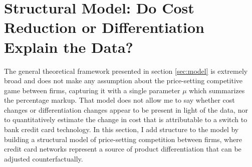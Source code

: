 \documentclass[12pt,english]{article}
\begin{document}

\section{Structural Model: Do Cost Reduction or Differentiation Explain the Data?}\label{sec:structural}

The general theoretical framework presented in section \ref{sec:model} is extremely broad and does not make any assumption about the price-setting competitive game between firms, capturing it with a single parameter $\mu$ which summarizes the percentage markup. That model does not allow me to say whether cost changes or differentiation changes appear to be present in light of the data, nor to quantitatively estimate the change in cost that is attributable to a switch to bank credit card technology. In this section, I add structure to the model by building a structural model of price-setting competition between firms, where credit card networks represent a source of product differentiation that can be adjusted counterfactually.
\end{document}
